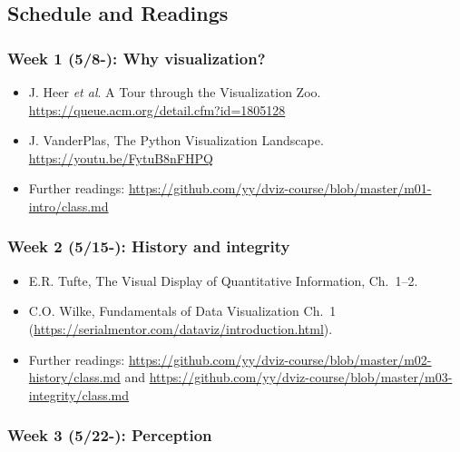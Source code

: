 \subsection{Schedule and Readings}\label{sub:schedule}%

\subsubsection{Week 1 (5/8-): Why visualization?} %

\begin{itemize}\itemsep0em 
\item J. Heer \emph{et al}. A Tour through the Visualization Zoo. \url{https://queue.acm.org/detail.cfm?id=1805128}
\item J. VanderPlas, The Python Visualization Landscape. \url{https://youtu.be/FytuB8nFHPQ}
\item Further readings: \url{https://github.com/yy/dviz-course/blob/master/m01-intro/class.md}
\end{itemize}	

\subsubsection{Week 2 (5/15-): History and integrity}%

\begin{itemize}\itemsep0em 
\item E.R. Tufte, The Visual Display of Quantitative Information, Ch.~1--2.
\item C.O. Wilke, Fundamentals of Data Visualization Ch.~1 (\url{https://serialmentor.com/dataviz/introduction.html}). 
\item Further readings: \url{https://github.com/yy/dviz-course/blob/master/m02-history/class.md} and \url{https://github.com/yy/dviz-course/blob/master/m03-integrity/class.md}
\end{itemize}	


\subsubsection{Week 3 (5/22-): Perception}%

